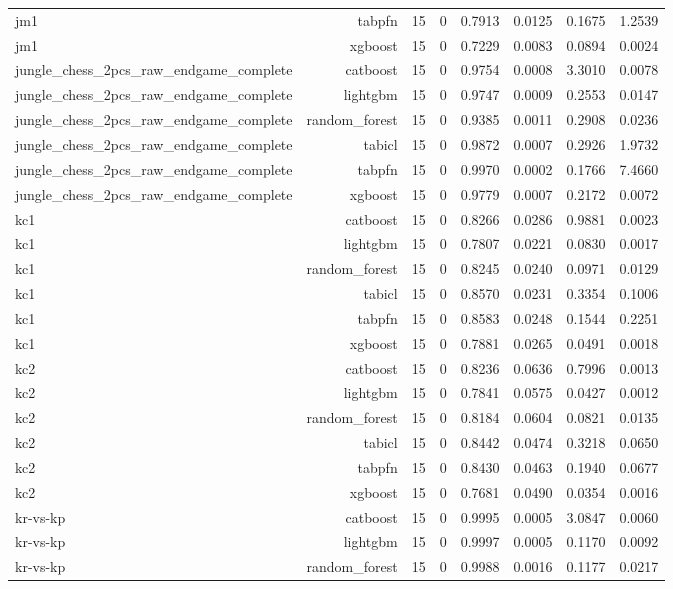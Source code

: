 \begin{table}[htbp]
\begin{tabular}{lrrrrrrr}
jm1 & tabpfn & 15 & 0 & 0.7913 & 0.0125 & 0.1675 & 1.2539 \\
jm1 & xgboost & 15 & 0 & 0.7229 & 0.0083 & 0.0894 & 0.0024 \\
jungle\_chess\_2pcs\_raw\_endgame\_complete & catboost & 15 & 0 & 0.9754 & 0.0008 & 3.3010 & 0.0078 \\
jungle\_chess\_2pcs\_raw\_endgame\_complete & lightgbm & 15 & 0 & 0.9747 & 0.0009 & 0.2553 & 0.0147 \\
jungle\_chess\_2pcs\_raw\_endgame\_complete & random\_forest & 15 & 0 & 0.9385 & 0.0011 & 0.2908 & 0.0236 \\
jungle\_chess\_2pcs\_raw\_endgame\_complete & tabicl & 15 & 0 & 0.9872 & 0.0007 & 0.2926 & 1.9732 \\
jungle\_chess\_2pcs\_raw\_endgame\_complete & tabpfn & 15 & 0 & 0.9970 & 0.0002 & 0.1766 & 7.4660 \\
jungle\_chess\_2pcs\_raw\_endgame\_complete & xgboost & 15 & 0 & 0.9779 & 0.0007 & 0.2172 & 0.0072 \\
kc1 & catboost & 15 & 0 & 0.8266 & 0.0286 & 0.9881 & 0.0023 \\
kc1 & lightgbm & 15 & 0 & 0.7807 & 0.0221 & 0.0830 & 0.0017 \\
kc1 & random\_forest & 15 & 0 & 0.8245 & 0.0240 & 0.0971 & 0.0129 \\
kc1 & tabicl & 15 & 0 & 0.8570 & 0.0231 & 0.3354 & 0.1006 \\
kc1 & tabpfn & 15 & 0 & 0.8583 & 0.0248 & 0.1544 & 0.2251 \\
kc1 & xgboost & 15 & 0 & 0.7881 & 0.0265 & 0.0491 & 0.0018 \\
kc2 & catboost & 15 & 0 & 0.8236 & 0.0636 & 0.7996 & 0.0013 \\
kc2 & lightgbm & 15 & 0 & 0.7841 & 0.0575 & 0.0427 & 0.0012 \\
kc2 & random\_forest & 15 & 0 & 0.8184 & 0.0604 & 0.0821 & 0.0135 \\
kc2 & tabicl & 15 & 0 & 0.8442 & 0.0474 & 0.3218 & 0.0650 \\
kc2 & tabpfn & 15 & 0 & 0.8430 & 0.0463 & 0.1940 & 0.0677 \\
kc2 & xgboost & 15 & 0 & 0.7681 & 0.0490 & 0.0354 & 0.0016 \\
kr-vs-kp & catboost & 15 & 0 & 0.9995 & 0.0005 & 3.0847 & 0.0060 \\
kr-vs-kp & lightgbm & 15 & 0 & 0.9997 & 0.0005 & 0.1170 & 0.0092 \\
kr-vs-kp & random\_forest & 15 & 0 & 0.9988 & 0.0016 & 0.1177 & 0.0217 \\

\end{tabular}
\end{table}

